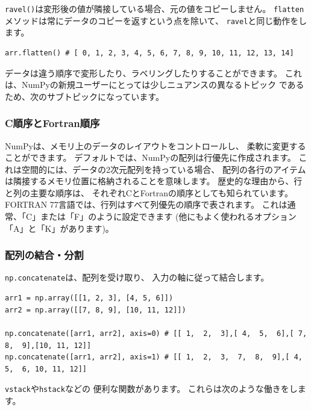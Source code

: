 \documentclass{jsarticle}
\begin{document}
            \verb|ravel()|は変形後の値が隣接している場合、元の値をコピーしません。
            \verb|flatten|メソッドは常にデータのコピーを返すという点を除いて、
            \verb|ravel|と同じ動作をします。

            \begin{lstlisting}
arr.flatten() # [ 0, 1, 2, 3, 4, 5, 6, 7, 8, 9, 10, 11, 12, 13, 14]\end{lstlisting}

            データは違う順序で変形したり、ラベリングしたりすることができます。
            これは、NumPyの新規ユーザーにとっては少しニュアンスの異なるトピック
            であるため、次のサブトピックになっています。

        \subsubsection*{C順序とFortran順序}
            NumPyは、メモリ上のデータのレイアウトをコントロールし、
            柔軟に変更することができます。
            デフォルトでは、NumPyの配列は行優先に作成されます。
            これは空間的には、データの2次元配列を持っている場合、
            配列の各行のアイテムは隣接するメモリ位置に格納されることを意味します。
            歴史的な理由から、行と列の主要な順序は、
            それぞれCとFortranの順序としても知られています。
            FORTRAN 77言語では、行列はすべて列優先の順序で表されます。
            これは通常、「C」または「F」のように設定できます
            (他にもよく使われるオプション「A」と「K」があります)。

        \subsubsection*{配列の結合・分割}
            \verb|np.concatenate|は、配列を受け取り、
            入力の軸に従って結合します。

            \begin{lstlisting}
arr1 = np.array([[1, 2, 3], [4, 5, 6]])
arr2 = np.array([[7, 8, 9], [10, 11, 12]])

np.concatenate([arr1, arr2], axis=0) # [[ 1,  2,  3],[ 4,  5,  6],[ 7,  8,  9],[10, 11, 12]]
np.concatenate([arr1, arr2], axis=1) # [[ 1,  2,  3,  7,  8,  9],[ 4,  5,  6, 10, 11, 12]]\end{lstlisting}

            \verb|vstack|や\verb|hstack|などの
            便利な関数があります。
            これらは次のような働きをします。
\end{document}
